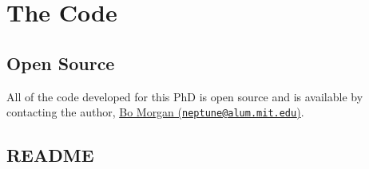 \chapter{The Code}\label{appendix:the_code}

\section{Open Source}

All of the code developed for this PhD is open source and is available
by contacting the author, \href{mailto:neptune@alum.mit.edu}{Bo Morgan
  (\nolinkurl{neptune@alum.mit.edu})}.

\section{README}

